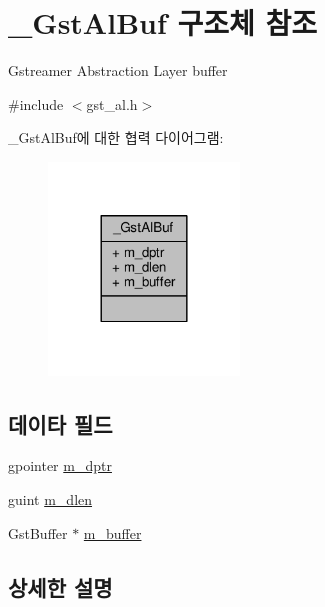 \hypertarget{struct___gst_al_buf}{}\section{\+\_\+\+Gst\+Al\+Buf 구조체 참조}
\label{struct___gst_al_buf}



\begin{DoxyItemize}
\item Gstreamer Abstraction Layer buffer 
\end{DoxyItemize} 




{\ttfamily \#include $<$gst\+\_\+al.\+h$>$}



\+\_\+\+Gst\+Al\+Buf에 대한 협력 다이어그램\+:
\nopagebreak
\begin{figure}[H]
\begin{center}
\leavevmode
\includegraphics[width=144pt]{struct___gst_al_buf__coll__graph}
\end{center}
\end{figure}
\subsection*{데이타 필드}
\begin{DoxyCompactItemize}
\item 
gpointer \hyperlink{struct___gst_al_buf_af816e6d2aeca9ce8a164007a969c02bd}{m\+\_\+dptr}
\item 
guint \hyperlink{struct___gst_al_buf_a65fa93d8c9a5923310d1350432b670de}{m\+\_\+dlen}
\item 
Gst\+Buffer $\ast$ \hyperlink{struct___gst_al_buf_aae73c5ec81b259f66d177d20c4f7c800}{m\+\_\+buffer}
\end{DoxyCompactItemize}


\subsection{상세한 설명}

